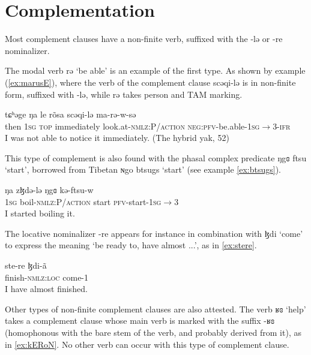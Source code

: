 \documentclass[oneside,a4paper,11pt]{article}
\newcommand{\ipa}[1]{{\phon #1}} %
\begin{document}
 
 

\section{Complementation}  
Most complement clauses have a non-finite verb, suffixed with the \ipa{-lə} or \ipa{-re} nominalizer.

The modal verb \ipa{rə} `be able' is an example of the first type. As shown by example (\ref{ex:marusE}), where the verb of the complement clause \ipa{scəqi-lə}  is in non-finite form, suffixed with \ipa{-lə}, while \ipa{rə} takes person and TAM marking.

\begin{exe}
\ex\label{ex:marusE}
\gll
\ipa{tɕʰəge} 	\ipa{ŋa} 	\ipa{le} 	\ipa{rõsa} 	\ipa{scəqi-lə} 	\ipa{ma-rə-w-sə} \\
then \textsc{1sg} \textsc{top} immediately look.at-\textsc{nmlz:P/action} \textsc{neg:pfv}-be.able-\textsc{1sg}$\rightarrow$3-\textsc{ifr} \\
\glt I was not able to notice it immediately. (The hybrid yak, 52)
\end{exe}

This type of complement is also found with the phasal complex predicate \ipa{ŋgɞ} \ipa{ftsu} `start', borrowed from Tibetan \ipa{ɴgo btsugs} `start' (see example \ref{ex:btsugs}).

\begin{exe}
\ex \label{ex:btsugs}
\gll 
\ipa{ŋa} 	\ipa{zɮdə-lə} 	\ipa{ŋgɞ} 	\ipa{kə-ftsu-w} \\
\textsc{1sg} boil-\textsc{nmlz:P/action} start \textsc{pfv}-start-\textsc{1sg}$\rightarrow$3 \\
\glt I started boiling it.
\end{exe}

The locative nominalizer \ipa{-re} appears for instance in combination with \ipa{ɮdi} `come' to express the meaning `be ready to, have almost ...', as in \ref{ex:stere}.

\begin{exe}
\ex \label{ex:stere}
\gll 
 \ipa{ste-re} 	\ipa{ɮdi-ã} \\
finish-\textsc{nmlz:loc} come-1 \\
\glt I have almost finished.
\end{exe}



Other types of non-finite complement clauses are also attested. The verb \ipa{ʁɞ} `help' takes a complement clause  whose main verb is marked with the suffix \ipa{-ʁɞ} (homophonous with the bare stem of the verb, and probably derived from it), as in \ref{ex:kERoN}. No other verb can occur with this type of complement clause.
\end{document}
